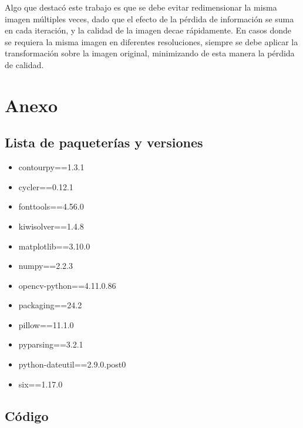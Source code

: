 \documentclass[12pt]{article}
\begin{document}
Algo que destacó este trabajo es que se debe evitar redimensionar la misma imagen múltiples veces, dado que el efecto de la pérdida de información se suma en cada iteración, y la calidad de la imagen decae rápidamente. En casos donde se requiera la misma imagen en diferentes resoluciones, siempre se debe aplicar la transformación sobre la imagen original, minimizando de esta manera la pérdida de calidad. 




\section{Anexo}
\subsection{Lista de paqueterías y versiones}
\begin{itemize}
	\item contourpy==1.3.1
	\item cycler==0.12.1
	\item fonttools==4.56.0
	\item kiwisolver==1.4.8
	\item matplotlib==3.10.0
	\item numpy==2.2.3
	\item opencv-python==4.11.0.86
	\item packaging==24.2
	\item pillow==11.1.0
	\item pyparsing==3.2.1
	\item python-dateutil==2.9.0.post0
	\item six==1.17.0
\end{itemize}

\subsection{Código}

\end{document}
